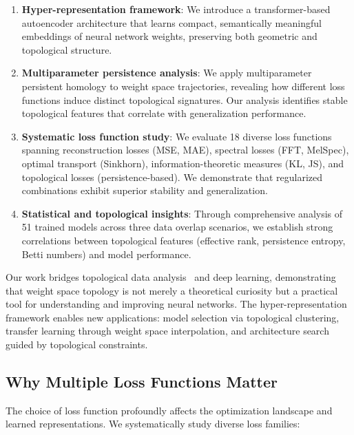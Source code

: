 \begin{enumerate}
    \item \textbf{Hyper-representation framework}: We introduce a transformer-based autoencoder architecture that learns compact, semantically meaningful embeddings of neural network weights, preserving both geometric and topological structure.
    
    \item \textbf{Multiparameter persistence analysis}: We apply multiparameter persistent homology to weight space trajectories, revealing how different loss functions induce distinct topological signatures. Our analysis identifies stable topological features that correlate with generalization performance.
    
    \item \textbf{Systematic loss function study}: We evaluate 18 diverse loss functions spanning reconstruction losses (MSE, MAE), spectral losses (FFT, MelSpec), optimal transport (Sinkhorn), information-theoretic measures (KL, JS), and topological losses (persistence-based). We demonstrate that regularized combinations exhibit superior stability and generalization.
    
    \item \textbf{Statistical and topological insights}: Through comprehensive analysis of 51 trained models across three data overlap scenarios, we establish strong correlations between topological features (effective rank, persistence entropy, Betti numbers) and model performance.
\end{enumerate}

Our work bridges topological data analysis~\cite{ballesterTopologicalDataAnalysis2024} and deep learning, demonstrating that weight space topology is not merely a theoretical curiosity but a practical tool for understanding and improving neural networks. The hyper-representation framework enables new applications: model selection via topological clustering, transfer learning through weight space interpolation, and architecture search guided by topological constraints.

\subsection{Why Multiple Loss Functions Matter}

The choice of loss function profoundly affects the optimization landscape and learned representations. We systematically study diverse loss families:

